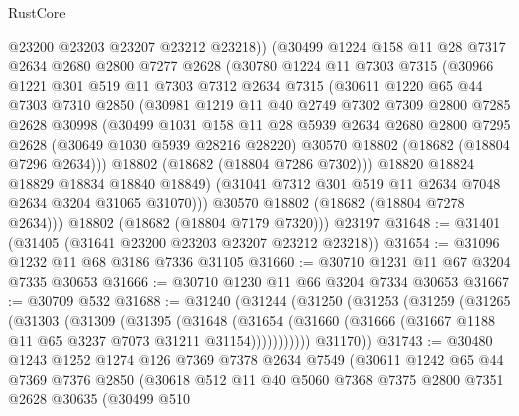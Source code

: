 \begin{lexlean}{RustCore}
\begin{coremodule}
          @23200
          @23203
          @23207
          @23212
          @23218))
      (@30499
        @1224
        @158
        @11
        @28
        @7317
        @2634
        @2680
        @2800
        @7277
        @2628
        (@30780
          @1224
          @11
          @7303
          @7315
          (@30966
            @1221
            @301
            @519
            @11
            @7303
            @7312
            @2634
            @7315
            (@30611
              @1220
              @65
              @44
              @7303
              @7310
              @2850
              (@30981
                @1219
                @11
                @40
                @2749
                @7302
                @7309
                @2800
                @7285
                @2628
                @30998
                (@30499
                  @1031
                  @158
                  @11
                  @28
                  @5939
                  @2634
                  @2680
                  @2800
                  @7295
                  @2628
                  (@30649 @1030 @5939 @28216 @28220)
                  @30570
                  @18802
                  (@18682 (@18804 @7296 @2634)))
                @18802
                (@18682 (@18804 @7286 @7302)))
              @18820
              @18824
              @18829
              @18834
              @18840
              @18849)
            (@31041 @7312 @301 @519 @11 @2634 @7048 @2634 @3204 @31065 @31070)))
        @30570
        @18802
        (@18682 (@18804 @7278 @2634)))
      @18802
      (@18682 (@18804 @7179 @7320)))
    @23197
@31648 := @31401 (@31405 (@31641 @23200 @23203 @23207 @23212 @23218))
@31654 := @31096 @1232 @11 @68 @3186 @7336 @31105
@31660 := @30710 @1231 @11 @67 @3204 @7335 @30653
@31666 := @30710 @1230 @11 @66 @3204 @7334 @30653
@31667 := @30709 @532
@31688 := @31240
    (@31244
      (@31250
        (@31253
          (@31259
            (@31265
              (@31303
                (@31309
                  (@31395
                    (@31648
                      (@31654
                        (@31660 (@31666 (@31667 @1188 @11 @65 @3237 @7073 @31211 @31154)))))))))))
        @31170))
@31743 := @30480
    @1243
    @1252
    @1274
    @126
    @7369
    @7378
    @2634
    @7549
    (@30611
      @1242
      @65
      @44
      @7369
      @7376
      @2850
      (@30618
        @512
        @11
        @40
        @5060
        @7368
        @7375
        @2800
        @7351
        @2628
        @30635
        (@30499
          @510

\end{coremodule}
\end{lexlean}
